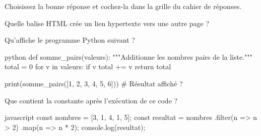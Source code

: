 %


\begin{instructions}
  Choisissez la bonne réponse et cochez-la dans la grille du cahier de
  réponses.
\end{instructions}

\begin{mcq}
  Quelle balise HTML crée un lien hypertexte vers une autre page ?
  \begin{choices}[columns=4]
    \wrong   {}
    \correct {}
    \wrong   {}
    \wrong   {}
  \end{choices}
\end{mcq}

\begin{mcq}
  Qu'affiche le programme Python suivant ?
\begin{code}{python}
def somme_pairs(valeurs):
    """Additionne les nombres pairs de la liste."""
    total = 0
    for v in valeurs:
        if v %
            total += v
    return total

print(somme_pairs([1, 2, 3, 4, 5, 6]))  # Résultat affiché ?
\end{code}
  \begin{choices}[columns=4]
    \wrong   {}
    \correct {}
    \wrong   {}
    \wrong   {}
  \end{choices}
\end{mcq}

\begin{mcq}
  Que contient la constante  après l'exécution de ce code ?
\begin{code}{javascript}
const nombres = [3, 1, 4, 1, 5];
const resultat = nombres
  .filter(n => n > 2)
  .map(n => n * 2);
console.log(resultat);
\end{code}
  \begin{choices}[columns=2]
    \wrong   \codeinline{[6, 2, 8, 2, 10]}
    \correct \codeinline{[6, 8, 10]}
    \wrong   \codeinline{[3, 4, 5]}
    \wrong   \codeinline{[8, 10]}
  \end{choices}
\end{mcq}

